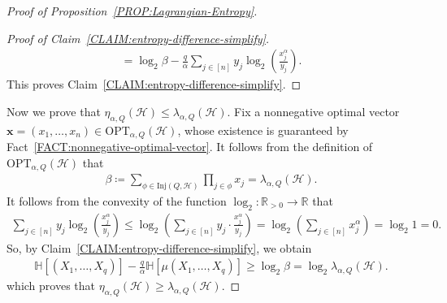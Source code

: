 \documentclass[11pt,a4paper]{article}
\begin{document}
\begin{proof}[Proof of Proposition~\ref{PROP:Lagrangian-Entropy}]
\begin{proof}[Proof of Claim~\ref{CLAIM:entropy-difference-simplify}]
\begin{align*}
            = \log_{2} \beta - \frac{q}{\alpha} \sum_{j \in [n]} y_j \log_{2}\left(\frac{x_j^{\alpha}}{y_j}\right). 
        \end{align*}
        This proves Claim~\ref{CLAIM:entropy-difference-simplify}. 
    \end{proof}%

    Now we prove that $\eta_{\alpha, Q}(\mathcal{H}) \le \lambda_{\alpha, Q}(\mathcal{H})$. 
    Fix a nonnegative optimal vector $\mathbf{x} = (x_1, \ldots, x_n) \in \mathrm{OPT}_{\alpha,Q}(\mathcal{H})$, whose existence is guaranteed by Fact~\ref{FACT:nonnegative-optimal-vector}. 
    It follows from the definition of $\mathrm{OPT}_{\alpha,Q}(\mathcal{H})$ that 
    \begin{align*}
        \beta
        \coloneqq \sum_{\phi \in \mathrm{Inj}(Q,\mathcal{H})} \prod_{j \in \phi} x_j
        = \lambda_{\alpha,Q}(\mathcal{H}). 
    \end{align*}
    It follows from the convexity of the function $\log_{2} \colon \mathbb{R}_{>0} \to \mathbb{R}$ that 
    \begin{align*}
        \sum_{j \in [n]} y_j \log_{2}\left(\frac{x_j^{\alpha}}{y_j}\right) 
        \le \log_{2}\left(\sum_{j \in [n]} y_j \cdot \frac{x_j^{\alpha}}{y_j}\right)
        = \log_{2} \left(\sum_{j \in [n]} x_j^{\alpha}\right)
        = \log_{2} 1
        = 0. 
    \end{align*}
    So, by Claim~\ref{CLAIM:entropy-difference-simplify}, we obtain 
    \begin{align*}
        \mathbb{H}\left[ (X_1, \ldots, X_{q}) \right] - \frac{q}{\alpha}  \mathbb{H}[\mu(X_{1}, \ldots, X_q)]
        \ge \log_{2}\beta
        = \log_{2} \lambda_{\alpha,Q}(\mathcal{H}). 
    \end{align*}
    which proves that $\eta_{\alpha, Q}(\mathcal{H}) \ge \lambda_{\alpha, Q}(\mathcal{H})$. 


\end{proof}
\end{document}
